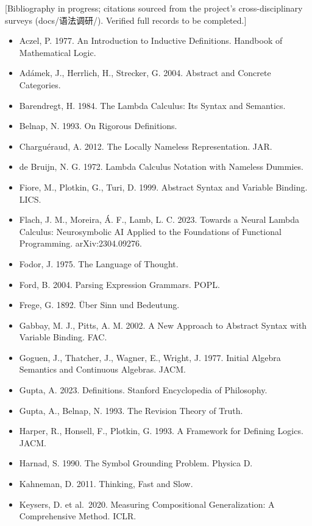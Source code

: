 \documentclass[
]{article}
\providecommand{\tightlist}{%
  \setlength{\itemsep}{0pt}\setlength{\parskip}{0pt}}
\begin{document}
{[}Bibliography in progress; citations sourced from the project's
cross-disciplinary surveys (docs/语法调研/). Verified full records to be
completed.{]}

\begin{itemize}
\tightlist
\item
  Aczel, P. 1977. An Introduction to Inductive Definitions. Handbook of
  Mathematical Logic.
\item
  Adámek, J., Herrlich, H., Strecker, G. 2004. Abstract and Concrete
  Categories.
\item
  Barendregt, H. 1984. The Lambda Calculus: Its Syntax and Semantics.
\item
  Belnap, N. 1993. On Rigorous Definitions.
\item
  Charguéraud, A. 2012. The Locally Nameless Representation. JAR.
\item
  de Bruijn, N. G. 1972. Lambda Calculus Notation with Nameless Dummies.
\item
  Fiore, M., Plotkin, G., Turi, D. 1999. Abstract Syntax and Variable
  Binding. LICS.
\item
  Flach, J. M., Moreira, Á. F., Lamb, L. C. 2023. Towards a Neural
  Lambda Calculus: Neurosymbolic AI Applied to the Foundations of
  Functional Programming. arXiv:2304.09276.
\item
  Fodor, J. 1975. The Language of Thought.
\item
  Ford, B. 2004. Parsing Expression Grammars. POPL.
\item
  Frege, G. 1892. Über Sinn und Bedeutung.
\item
  Gabbay, M. J., Pitts, A. M. 2002. A New Approach to Abstract Syntax
  with Variable Binding. FAC.
\item
  Goguen, J., Thatcher, J., Wagner, E., Wright, J. 1977. Initial Algebra
  Semantics and Continuous Algebras. JACM.
\item
  Gupta, A. 2023. Definitions. Stanford Encyclopedia of Philosophy.
\item
  Gupta, A., Belnap, N. 1993. The Revision Theory of Truth.
\item
  Harper, R., Honsell, F., Plotkin, G. 1993. A Framework for Defining
  Logics. JACM.
\item
  Harnad, S. 1990. The Symbol Grounding Problem. Physica D.
\item
  Kahneman, D. 2011. Thinking, Fast and Slow.
\item
  Keysers, D. et al.~2020. Measuring Compositional Generalization: A
  Comprehensive Method. ICLR.

\end{itemize}
\end{document}
